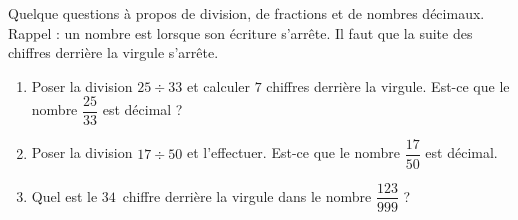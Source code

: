 
\begin{exercice}\label{exosmath-0841}

    Quelque questions à propos de division, de fractions et de nombres décimaux. Rappel : un nombre est  lorsque son écriture s'arrête. Il faut que la suite des chiffres derrière la virgule s'arrête.
    \begin{enumerate}
        \item
            Poser la division \( 25\div 33\) et calculer \( 7\) chiffres derrière la virgule. Est-ce que le nombre \( \dfrac{ 25 }{ 33 }\) est décimal ?
        \item
            Poser la division \( 17\div 50\) et l'effectuer. Est-ce que le nombre \( \dfrac{ 17 }{ 50 }\) est décimal.
        \item
            Quel est le \( 34\)\ieme\ chiffre derrière la virgule dans le nombre \( \dfrac{ 123 }{ 999 }\) ?
    \end{enumerate}

\end{exercice}
